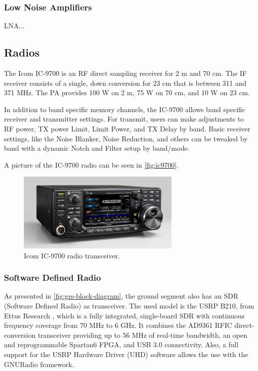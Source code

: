 \subsubsection{Low Noise Amplifiers}

LNA...

\subsection{Radios}

The Icom IC-9700 \cite{ic9700} is an RF direct sampling receiver for 2 m and 70 cm. The IF receiver consists of a single, down conversion for 23 cm that is between 311 and 371 MHz. The PA provides 100 W on 2 m, 75 W on 70 cm, and 10 W on 23 cm.

In addition to band specific memory channels, the IC-9700 allows band specific receiver and transmitter settings. For transmit, users can make adjustments to RF power, TX power Limit, Limit Power, and TX Delay by band. Basic receiver settings, like the Noise Blanker, Noise Reduction, and others can be tweaked by band with a dynamic Notch and Filter setup by band/mode.

A picture of the IC-9700 radio can be seen in \autoref{fig:ic9700}.

\begin{figure}[!ht]
    \begin{center}
        \includegraphics[width=0.7\textwidth]{figures/ic-9700.jpg}
        \caption{Icom IC-9700 radio transceiver.}
        \label{fig:ic9700}
    \end{center}
\end{figure}

\subsubsection{Software Defined Radio}

As presented in \autoref{fig:grs-block-diagram}, the ground segment also has an SDR (Software Defined Radio) as transceiver. The used model is the USRP B210, from Ettus Research \cite{b210}, which is a fully integrated, single-board SDR with continuous frequency coverage from 70 MHz to 6 GHz. It combines the AD9361 RFIC direct-conversion transceiver providing up to 56 MHz of real-time bandwidth, an open and reprogrammable Spartan6 FPGA, and USB 3.0 connectivity. Also, a full support for the USRP Hardware Driver (UHD) software allows the use with the GNURadio framework.

